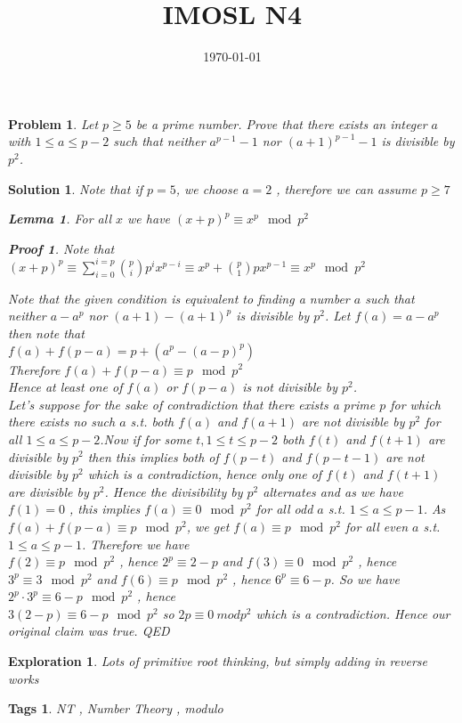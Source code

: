 \documentclass{article}
\title{IMOSL N4}
\date{\today}
\newtheorem*{problem}{Problem}
\newtheorem*{solution}{Solution}
\newtheorem*{lemma}{Lemma}
\newtheorem*{Proof}{Proof}
\newtheorem*{exploration}{Exploration}
\newtheorem*{tags}{Tags}
\begin{document}
	
	\maketitle
	
	\begin{problem}
		Let $p \geq 5$ be a prime number. Prove that
		there exists an integer $a$ with 
		$1 \leq a \leq p-2$ such that neither $a^{p-1} -  1$ nor  $(a + 1)^{p-1} -  1$ is
		divisible by $p^2$.
	\end{problem}
	
	\begin{solution}
		Note that if $p=5$, we choose $a=2$ , therefore we can assume $p \geq 7$
		\begin{lemma}
			For all $x$  we have $(x+p)^p \equiv x^p \mod p^2$
		\end{lemma}
		
		\begin{Proof}
			Note that $(x+p)^p \equiv \sum_{i=0}^{i=p} \binom{p}{i} p^i x^{p-i} \equiv x^p + \binom{p}{1} p x^ {p-1} \equiv x^p \mod p^2$
		\end{Proof}
		Note that the given condition is equivalent to finding a number $a$ such that neither 
		$a-a^{p} $ nor  $ (a+1) - (a + 1)^{p} $ is
		divisible by $p^2$. Let $f(a)=a-a^p$ then note that
		\\
		$f(a)+f(p-a) = p+ (a^p - (a-p)^p)$
		\\ 
		Therefore
		$f(a)+f(p-a) \equiv p \mod p^2$
		\\
		Hence at least one of $f(a)$ or $f(p-a)$ is not divisible by $p^2$.
		\\
		Let's suppose for the sake of contradiction that there exists a prime $p$ for which there exists no such $a$ s.t. both $f(a)$ and $f(a+1)$ are not divisible by  $p^2 $ for all $ 1\leq a \leq p-2$.Now if for some $t,1\leq t \leq p-2 $ both $f(t)$ and $f(t+1)$ are divisible by $p^2$ then this implies both of $f(p-t)$ and $f(p-t-1)$ are not divisible by $p^2$ which is a contradiction, hence only one of $f(t)$ and $f(t+1)$ are divisible by $p^2$. Hence the divisibility by $p^2$ alternates and as we have $f(1)=0$ , this implies $f(a) \equiv 0 \mod p^2$ for all odd $a$ s.t.  $1\leq a \leq p-1$. As 
		$f(a)+f(p-a) \equiv p \mod p^2$, we get $f(a) \equiv p \mod p^2$ for all even $a$ s.t.  $1\leq a \leq p-1$. Therefore we have 
		\\
		$f(2) \equiv p \mod p^2$ , hence $2^p \equiv 2-p $ and $f(3) \equiv 0 \mod p^2$ , hence $3^p \equiv 3 \mod p^2$ and $f(6) \equiv p \mod p^2$ , hence $6^p \equiv 6-p $. So we have 
		\\
		$2^p \cdot 3^p \equiv 6-p \mod p^2$ , hence
		\\
		$3(2-p) \equiv 6-p \mod p^2$ so $2p \equiv 0 \ mod p^2$ which is a contradiction.
		Hence our original claim was true. QED
		
	\end{solution}
	
	\begin{exploration}
		Lots of primitive root thinking, but simply adding in reverse works
	\end{exploration}
	
	\begin{tags}
		NT ,  Number Theory , modulo 
	\end{tags}
	
\end{document}
